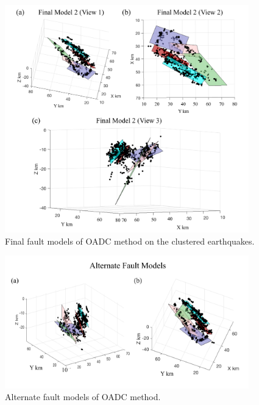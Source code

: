 \documentclass[draft]{agujournal2018}
\begin{document}
\begin{figure}[ht]
\centering
\includegraphics[width=25pc]{Figures/OADC_fig_final2.png}
\caption{Final fault models of OADC method on the clustered earthquakes.}
\label{figsix}
\end{figure}


\begin{figure}[ht]
\centering
\includegraphics[width=25pc]{Figures/OADC_fig_alt_models.png}
\caption{Alternate fault models of OADC method.}
\label{figsix}
\end{figure}
\end{document}
